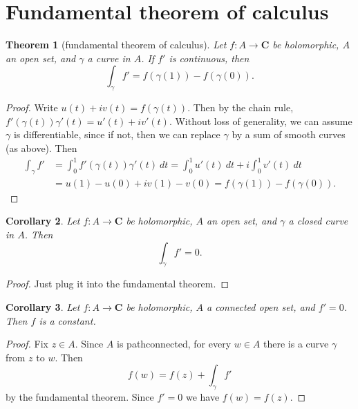 \documentclass[12pt]{report}
\newcommand{\CC}{\mathbf{C}}
\newtheorem{theorem}{Theorem}[chapter]
\newtheorem{corollary}[theorem]{Corollary}
\theoremstyle{definition}
\theoremstyle{remark}
\begin{document}
\section{Fundamental theorem of calculus}
\begin{theorem}[fundamental theorem of calculus]
Let $f: A \to \CC$ be holomorphic, $A$ an open set, and $\gamma$ a curve in $A$. If $f'$ is continuous, then
$$\int_\gamma f' = f(\gamma(1)) - f(\gamma(0)).$$
\end{theorem}
\begin{proof}
Write $u(t) + iv(t) = f(\gamma(t))$. Then by the chain rule, $f'(\gamma(t))\gamma'(t) = u'(t) + iv'(t)$. Without loss of generality, we can assume $\gamma$ is differentiable, since if not, then we can replace $\gamma$ by a sum of smooth curves (as above). Then
\begin{align*}
\int_\gamma f' &= \int_0^1 f'(\gamma(t)) \gamma'(t) ~dt = \int_0^1 u'(t) ~dt + i\int_0^1 v'(t) ~dt \\&= u(1) - u(0) + iv(1) - v(0) = f(\gamma(1)) - f(\gamma(0)).\end{align*}
\end{proof}


\begin{corollary}
Let $f: A \to \CC$ be holomorphic, $A$ an open set, and $\gamma$ a closed curve in $A$. Then
$$\int_\gamma f' = 0.$$
\end{corollary}
\begin{proof}
Just plug it into the fundamental theorem.
\end{proof}
\begin{corollary}
Let $f: A \to \CC$ be holomorphic, $A$ a connected open set, and $f' = 0$. Then $f$ is a constant.
\end{corollary}
\begin{proof}
Fix $z \in A$. Since $A$ is pathconnected, for every $w \in A$ there is a curve $\gamma$ from $z$ to $w$. Then
$$f(w) = f(z) + \int_\gamma f'$$
by the fundamental theorem. Since $f' = 0$ we have $f(w) = f(z)$.
\end{proof}
\end{document}
